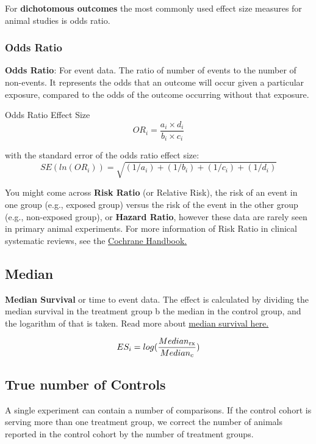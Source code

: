 \documentclass[
]{book}
\begin{document}
For \textbf{dichotomous outcomes} the most commonly used effect size measures for animal studies is odds ratio.

\hypertarget{odds-ratio}{%
\subsubsection{Odds Ratio}\label{odds-ratio}}

\textbf{Odds Ratio}: For event data. The ratio of number of events to the number of non-events. It represents the odds that an outcome will occur given a particular exposure, compared to the odds of the outcome occurring without that exposure.

Odds Ratio Effect Size
\[ OR_i = \frac {a_i \times d_i}{b_i \times c_i}  \]

with the standard error of the odds ratio effect size:
\[ SE(ln(OR_i)) = \sqrt{ (1/a_i)+(1/b_i)+(1/c_i)+(1/d_i) }   \]

You might come across \textbf{Risk Ratio} (or Relative Risk), the risk of an event in one group (e.g., exposed group) versus the risk of the event in the other group (e.g., non-exposed group), or \textbf{Hazard Ratio}, however these data are rarely seen in primary animal experiments. For more information of Risk Ratio in clinical systematic reviews, see the \href{https://handbook-5-1.cochrane.org/chapter_9/box_9_2_a_calculation_of_risk_ratio_rr_odds_ratio_or_and.htm}{Cochrane Handbook.}

\hypertarget{median}{%
\subsection{Median}\label{median}}

\textbf{Median Survival} or time to event data. The effect is calculated by dividing the median survival in the treatment group b the median in the control group, and the logarithm of that is taken. Read more about \href{https://systematicreviewsjournal.biomedcentral.com/articles/10.1186/s13643-021-01824-0}{median survival here.}

\[ ES_i = log (\frac{Median_{\rm rx}}{Median_c} ) \]

\hypertarget{true-number-of-controls}{%
\subsection{True number of Controls}\label{true-number-of-controls}}

A single experiment can contain a number of comparisons. If the control cohort is serving more than one treatment group, we correct the number of animals reported in the control cohort by the number of treatment groups.
\end{document}
